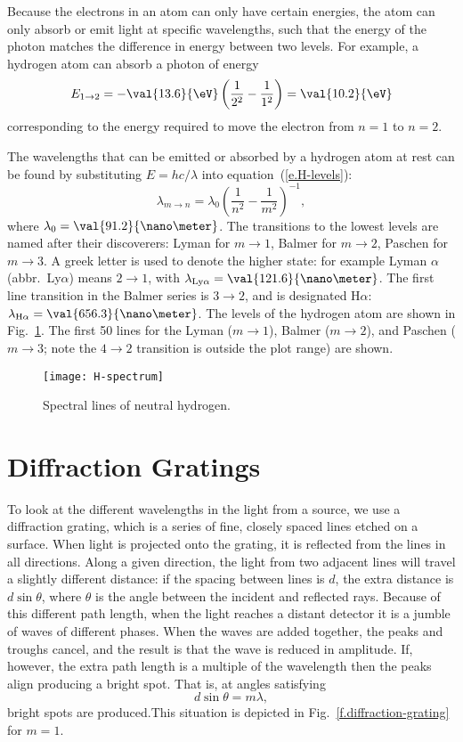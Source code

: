Because the electrons in an atom can only have certain energies, the atom can only absorb or emit light at specific wavelengths, such that the energy of the photon matches the difference in energy between two levels.  For example, a hydrogen atom can absorb a photon of energy
\[
	E_{1\to2} = -\val{13.6}{\eV} \left(\frac{1}{2^{2}} - \frac{1}{1^{2}}\right)
		 = \val{10.2}{\eV}
\]
corresponding to the energy required to move the electron from  $n=1$ to $n=2$.

The wavelengths that can be emitted or absorbed by a hydrogen atom at rest can be found by substituting $E = hc/\lambda$ into equation~(\ref{e.H-levels}):
\begin{equation}
	\lambda_{m\to n} = \lambda_{0}\left(\frac{1}{n^{2}}-\frac{1}{m^{2}}\right)^{-1},
\end{equation}
where $\lambda_{0} = \val{91.2}{\nano\meter}$.
The transitions to the lowest levels are named after their discoverers: Lyman for $m\to1$, Balmer for $m\to2$, Paschen for $m\to3$. A greek letter is used to denote the higher state: for example Lyman $\alpha$ (abbr.\ Ly$\alpha$) means $2\to1$, with $\lambda_{\mathrm{Ly}\alpha} = \val{121.6}{\nano\meter}$.  The first line transition in the Balmer series is $3\to2$, and is designated H$\alpha$: $\lambda_{\mathrm{H}\alpha} = \val{656.3}{\nano\meter}$. The levels of the hydrogen atom are shown in Fig.~\ref{f.H-spectrum}. The first 50 lines for the Lyman ($m\to1$), Balmer ($m\to2$), and Paschen ($m\to3$; note the $4\to2$ transition is outside the plot range) are shown.

\begin{figure}[htbp]
\texttt{[image: H-spectrum]}
\caption{Spectral lines of neutral hydrogen. 
\label{f.H-spectrum}}
\end{figure}

\section{Diffraction Gratings}

To look at the different wavelengths in the light from a source, we use a diffraction grating, which is a series of fine, closely spaced lines etched on a surface.  When light is projected onto the grating, it is reflected from the lines in all directions.  Along a given direction, the light from two adjacent lines will travel a slightly different distance: if the spacing between lines is $d$, the extra distance is $d\sin\theta$, where $\theta$ is the angle between the incident and reflected rays. Because of this different path length, when the light reaches a distant detector it is a jumble of waves of different phases. When the waves are added together, the peaks and troughs cancel, and the result is that the wave is reduced in amplitude.  If, however, the extra path length is a multiple of the wavelength then the peaks align producing a bright spot. That is, at angles satisfying
\begin{equation}
d\sin\theta = m\lambda,
\end{equation}
bright spots are produced.This situation is depicted in Fig.~\ref{f.diffraction-grating} for $m=1$.

